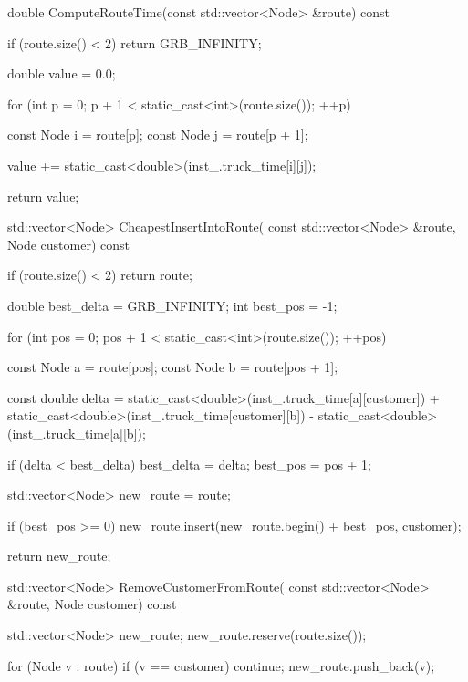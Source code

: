 {{{            double ComputeRouteTime(const std::vector<Node> &route) const
            {
                if (route.size() < 2)
                    return GRB_INFINITY;

                double value = 0.0;

                for (int p = 0; p + 1 < static_cast<int>(route.size()); ++p)
                {
                    const Node i = route[p];
                    const Node j = route[p + 1];

                    value += static_cast<double>(inst_.truck_time[i][j]);
                }

                return value;
            }

            std::vector<Node> CheapestInsertIntoRoute(
                const std::vector<Node> &route,
                Node customer) const
            {
                if (route.size() < 2)
                    return route;

                double best_delta = GRB_INFINITY;
                int best_pos = -1;

                for (int pos = 0; pos + 1 < static_cast<int>(route.size()); ++pos)
                {
                    const Node a = route[pos];
                    const Node b = route[pos + 1];

                    const double delta =
                        static_cast<double>(inst_.truck_time[a][customer]) +
                        static_cast<double>(inst_.truck_time[customer][b]) -
                        static_cast<double>(inst_.truck_time[a][b]);

                    if (delta < best_delta)
                    {
                        best_delta = delta;
                        best_pos = pos + 1;
                    }
                }

                std::vector<Node> new_route = route;

                if (best_pos >= 0)
                {
                    new_route.insert(new_route.begin() + best_pos, customer);
                }

                return new_route;
            }

            std::vector<Node> RemoveCustomerFromRoute(
                const std::vector<Node> &route,
                Node customer) const
            {
                std::vector<Node> new_route;
                new_route.reserve(route.size());

                for (Node v : route)
                {
                    if (v == customer)
                        continue;
                    new_route.push_back(v);
                }

}}}}
